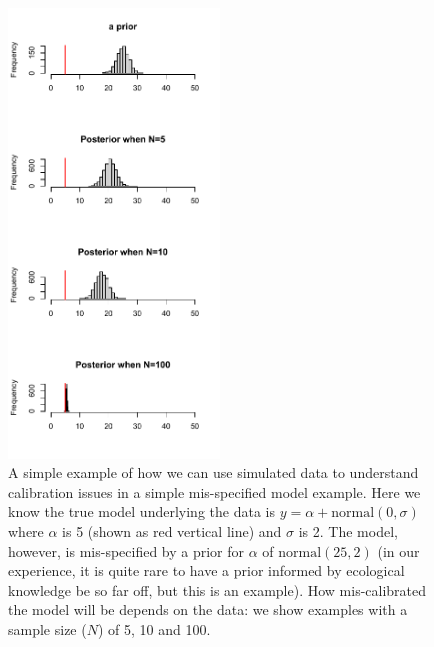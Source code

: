 \documentclass[11pt]{article}
\begin{document}
{\begin{figure}[ht]
\centering
\noindent \includegraphics[width=0.5\textwidth]{examples/misspecifiedmodel/priorpostforflows.pdf}
\caption{A simple example of how we can use simulated data to understand calibration issues in a simple mis-specified model example. Here we know the true model underlying the data is $y=\alpha + \text{normal}(0, \sigma)$ where $\alpha$ is 5 (shown as red vertical line) and $\sigma$ is 2. The model, however, is mis-specified by a prior for $\alpha$ of $\text{normal}(25, 2)$ (in our experience, it is quite rare to have a prior informed by ecological knowledge be so far off, but this is an example). How mis-calibrated the model will be depends on the data: we show examples with a sample size ($N$) of 5, 10 and 100. }
\label{fig:misspecifyprior}
\end{figure}

}
\end{document}
